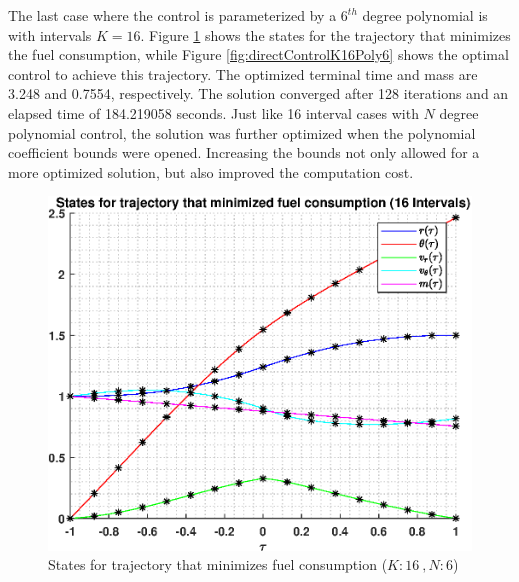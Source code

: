 \documentclass[]{article}
\begin{document}
\vspace{2mm}\newline 
The last case where the control is parameterized by a \(6^{th}\) degree polynomial is with intervals \(K = 16\). Figure \ref{fig:directStatesK16Poly6} shows the states for the trajectory that minimizes the fuel consumption, while Figure \ref{fig:directControlK16Poly6} shows the optimal control to achieve this trajectory. The optimized terminal time and mass are 3.248 and 0.7554, respectively. The solution converged after 128 iterations and an elapsed time of  184.219058 seconds. Just like 16 interval cases with \(N\) degree polynomial control, the solution was further optimized when the polynomial coefficient bounds were opened. Increasing the bounds not only allowed for a more optimized solution, but also improved the computation cost. 
\begin{figure}
	\centering
	\includegraphics[scale=0.75]{directStatesK16Poly6.eps}
	\caption{States for trajectory that minimizes fuel consumption (\(K:16\ , N:6\))}
	\label{fig:directStatesK16Poly6}
\end{figure}
\end{document}
